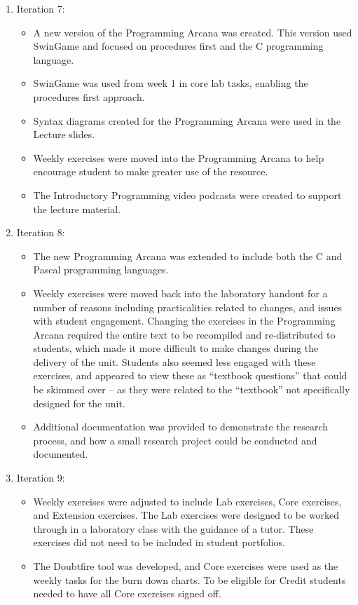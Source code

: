 \begin{enumerate}
  \item Iteration 7: 
  \begin{itemize}[noitemsep,nolistsep]
  	\item A new version of the Programming Arcana was created. This version used SwinGame and focused on procedures first and the C programming language.
  	\item SwinGame was used from week 1 in core lab tasks, enabling the procedures first approach.
  	\item Syntax diagrams created for the Programming Arcana were used in the Lecture slides.
  	\item Weekly exercises were moved into the Programming Arcana to help encourage student to make greater use of the resource.
  	\item The Introductory Programming video podcasts were created to support the lecture material.
  \end{itemize}

  \item Iteration 8:
  \begin{itemize}[noitemsep,nolistsep]
  	\item The new Programming Arcana was extended to include both the C and Pascal programming languages.
  	\item Weekly exercises were moved back into the laboratory handout for a number of reasons including practicalities related to changes, and issues with student engagement. Changing the exercises in the Programming Arcana required the entire text to be recompiled and re-distributed to students, which made it more difficult to make changes during the delivery of the unit. Students also seemed less engaged with these exercises, and appeared to view these as ``textbook questions'' that could be skimmed over -- as they were related to the ``textbook'' not specifically designed for the unit. 
  	\item Additional documentation was provided to demonstrate the research process, and how a small research project could be conducted and documented.
  \end{itemize}

  \item Iteration 9:
  \begin{itemize}[noitemsep,nolistsep]
  	\item Weekly exercises were adjusted to include Lab exercises, Core exercises, and Extension exercises. The Lab exercises were designed to be worked through in a laboratory class with the guidance of a tutor. These exercises did not need to be included in student portfolios.
  	\item The Doubtfire tool was developed, and Core exercises were used as the weekly tasks for the burn down charts. To be eligible for Credit students needed to have all Core exercises signed off.
  \end{itemize}
\end{enumerate}


